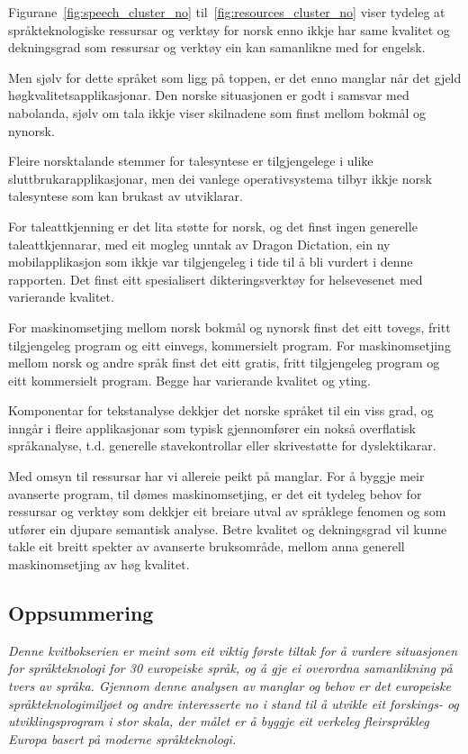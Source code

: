 \begin{multicols}{2}
Figurane~\ref{fig:speech_cluster_no} til~\ref{fig:resources_cluster_no} viser tydeleg at språkteknologiske ressursar og verktøy for norsk enno ikkje har same kvalitet og dekningsgrad som ressursar og verktøy ein kan samanlikne med for engelsk. 

Men sjølv for dette språket som ligg på toppen, er det enno manglar når det gjeld høgkvalitetsapplikasjonar. 
Den norske situasjonen er godt i samsvar med nabolanda, sjølv om tala ikkje viser skilnadene som finst mellom bokmål og nynorsk.

Fleire norsktalande stemmer for talesyntese er tilgjengelege i ulike sluttbrukarapplikasjonar, men dei vanlege operativsystema tilbyr ikkje norsk talesyntese som kan brukast av utviklarar. 

For taleattkjenning er det lita støtte for norsk, og det finst ingen generelle taleattkjennarar, med eit mogleg unntak av Dragon Dictation, ein ny mobilapplikasjon som ikkje var tilgjengeleg i tide til å bli vurdert i denne rapporten.
Det finst eitt spesialisert dikteringsverktøy for helsevesenet med varierande kvalitet.

For maskinomsetjing mellom norsk bokmål og nynorsk finst det eitt tovegs, fritt tilgjengeleg program og eitt einvegs, kommersielt program. 
For maskinomsetjing mellom norsk og andre språk finst det eitt gratis, fritt tilgjengeleg program og eitt kommersielt program. Begge har varierande kvalitet og yting.

Komponentar for tekstanalyse dekkjer det norske språket til ein viss grad, og inngår i fleire applikasjonar som typisk gjennomfører ein nokså overflatisk språkanalyse, t.d. generelle stavekontrollar eller skrivestøtte for dyslektikarar.

Med omsyn til ressursar har vi allereie peikt på manglar.
For å byggje meir avanserte program, til dømes maskinomsetjing, er det eit tydeleg behov for ressursar og verktøy som dekkjer eit breiare utval av språklege fenomen og som utfører ein djupare semantisk analyse. Betre kvalitet og dekningsgrad vil kunne takle eit breitt spekter av avanserte bruksområde, mellom anna  generell maskinomsetjing av høg kvalitet.

\subsection{Oppsummering}

\emph{Denne kvitbokserien er meint som eit viktig første tiltak for å vurdere situasjonen for språkteknologi for 30 europeiske språk, og å gje ei overordna samanlikning på tvers av språka. Gjennom denne analysen av manglar og behov er det europeiske språkteknologimiljøet og andre interesserte no i stand til å utvikle eit forskings- og utviklingsprogram i stor skala, der målet er å byggje eit verkeleg fleirspråkleg Europa basert på moderne språkteknologi.}


\end{multicols}

